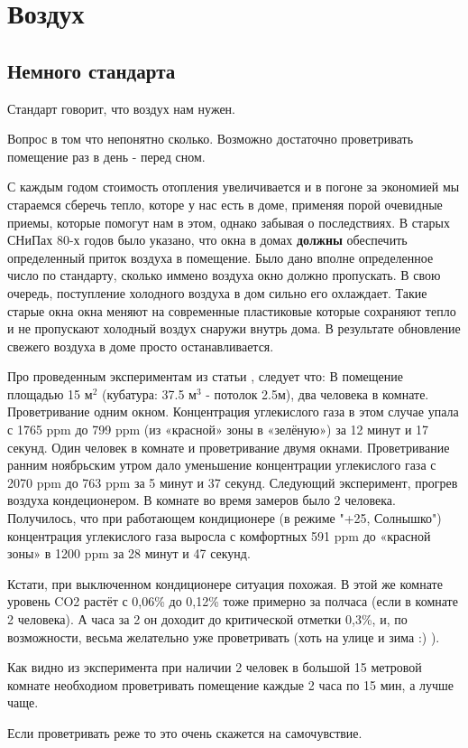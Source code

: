\part{Воздух}
\chapter{Немного стандарта}
Стандарт говорит, что воздух нам нужен.

Вопрос в том что непонятно сколько. Возможно достаточно проветривать помещение раз в день - перед сном.

С каждым годом стоимость отопления увеличивается и в погоне за экономией мы стараемся сберечь тепло, которе у нас есть в доме, применяя порой очевидные приемы, которые помогут нам в этом, однако забывая о последствиях. В старых СНиПах 80-х годов было указано, что окна в домах \textbf{должны} обеспечить определенный приток воздуха в помещение. Было дано вполне определенное число по стандарту, сколько иммено воздуха окно должно пропускать. В свою очередь, поступление холодного воздуха в дом сильно его охлаждает. Такие старые окна окна меняют на современные пластиковые которые сохраняют тепло и не пропускают холодный воздух снаружи внутрь дома. В результате обновление свежего воздуха в доме просто останавливается. 

Про проведенным экспериментам из статьи \cite{co2}, следует что:
В помещение площадью 15 $\text{м}^{2}$ (кубатура: 37.5 $\text{м}^3$ - потолок 2.5м), два человека в комнате. 
Проветривание одним окном. Концентрация углекислого газа в этом случае упала с 1765 ppm до 799 ppm (из «красной» зоны в «зелёную») за 12 минут и 17 секунд.
Один человек в комнате и проветривание двумя окнами. 
Проветривание ранним ноябрьским утром дало уменьшение концентрации углекислого газа с 2070 ppm до 763 ppm за 5 минут и 37 секунд.
Следующий эксперимент, прогрев воздуха кондеционером.
В комнате во время замеров было 2 человека. Получилось, что при работающем кондиционере (в режиме "+25, Солнышко") концентрация углекислого газа выросла с комфортных 591 ppm до «красной зоны» в 1200 ppm за 28 минут и 47 секунд.

Кстати, при выключенном кондиционере ситуация похожая. В этой же комнате уровень CO2 растёт с 0,06\% до 0,12\% тоже примерно за полчаса (если в комнате 2 человека). А часа за 2 он доходит до критической отметки 0,3\%, и, по возможности, весьма желательно уже проветривать (хоть на улице и зима :) ).

Как видно из эксперимента при наличии 2 человек в большой 15 метровой комнате необходиом проветривать помещение каждые 2 часа по 15 мин, а лучше чаще.

Если проветривать реже то это очень скажется на самочувствие.  


